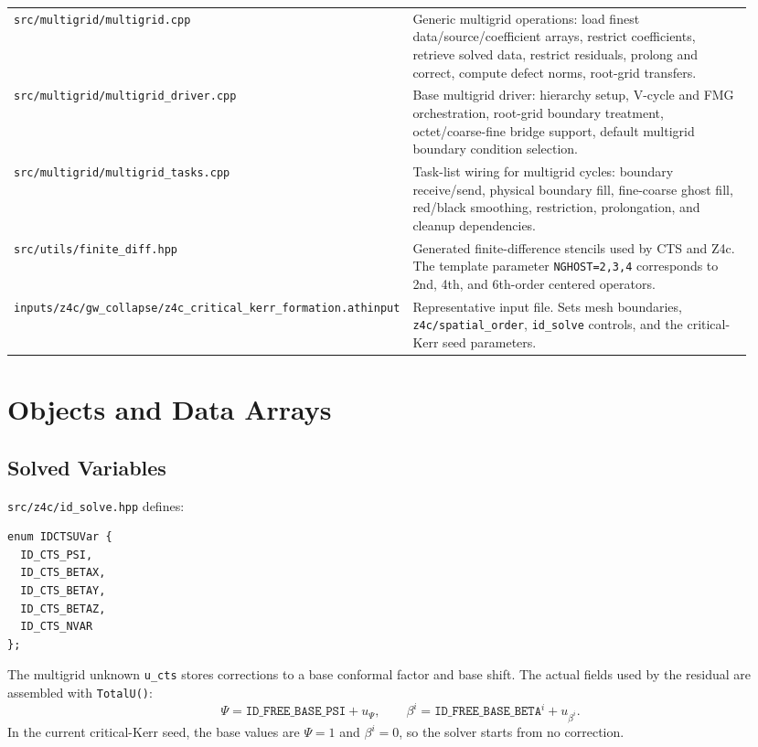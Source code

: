 \documentclass[11pt]{article}
\newcommand{\file}[1]{\nolinkurl{#1}}
\newcommand{\code}[1]{\texttt{#1}}
\begin{document}
\begin{longtable}{p{0.34\linewidth} p{0.60\linewidth}}
\addlinespace
\file{src/multigrid/multigrid.cpp} &
Generic multigrid operations: load finest data/source/coefficient arrays,
restrict coefficients, retrieve solved data, restrict residuals, prolong and
correct, compute defect norms, root-grid transfers. \\
\addlinespace
\file{src/multigrid/multigrid\_driver.cpp} &
Base multigrid driver: hierarchy setup, V-cycle and FMG orchestration, root-grid
boundary treatment, octet/coarse-fine bridge support, default multigrid boundary
condition selection. \\
\addlinespace
\file{src/multigrid/multigrid\_tasks.cpp} &
Task-list wiring for multigrid cycles: boundary receive/send, physical boundary
fill, fine-coarse ghost fill, red/black smoothing, restriction, prolongation, and
cleanup dependencies. \\
\addlinespace
\file{src/utils/finite\_diff.hpp} &
Generated finite-difference stencils used by CTS and Z4c.  The template
parameter \code{NGHOST=2,3,4} corresponds to 2nd, 4th, and 6th-order centered
operators. \\
\addlinespace
\file{inputs/z4c/gw\_collapse/z4c\_critical\_kerr\_formation.athinput} &
Representative input file.  Sets mesh boundaries, \code{z4c/spatial\_order},
\code{id\_solve} controls, and the critical-Kerr seed parameters. \\
\bottomrule
\end{longtable}

\section{Objects and Data Arrays}

\subsection{Solved Variables}

\file{src/z4c/id\_solve.hpp} defines:
\begin{lstlisting}
enum IDCTSUVar {
  ID_CTS_PSI,
  ID_CTS_BETAX,
  ID_CTS_BETAY,
  ID_CTS_BETAZ,
  ID_CTS_NVAR
};
\end{lstlisting}

The multigrid unknown \code{u\_cts} stores corrections to a base conformal factor
and base shift.  The actual fields used by the residual are assembled with
\code{TotalU()}:
\[
  \Psi = \code{ID\_FREE\_BASE\_PSI} + u_{\Psi}, \qquad
  \beta^i = \code{ID\_FREE\_BASE\_BETA}^i + u_{\beta^i}.
\]
In the current critical-Kerr seed, the base values are \(\Psi=1\) and
\(\beta^i=0\), so the solver starts from no correction.
\end{document}
